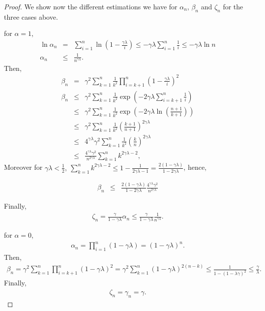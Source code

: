 \begin{proof}
We show now the different estimations we have for $\alpha_n$, $\beta_n$ and $\zeta_n$ for the three cases above.
\BIT
\item for $\alpha = 1$, 
\begin{eqnarray*}
\ln \alpha_n &=& \sum_{i=1}^n \ln \left( 1 - \frac{\gamma \lambda}{i}\right) \leqslant -\gamma \lambda \sum_{i=1}^n \frac{1}{i} \leqslant -\gamma\lambda \ln n \\
\alpha_n &\leqslant& \frac{1}{n^{\gamma \lambda}}.
\end{eqnarray*}
Then, 
\begin{eqnarray*}
\beta_n &=& \gamma^2 \sum_{k=1}^n \frac{1}{k^2}\prod_{i=k+1}^n \left( 1-\frac{\gamma\lambda}{i} \right)^2 \\
\beta_n &\leqslant& \gamma^2 \sum_{k=1}^n \frac{1}{k^2}\exp\left( -2 \gamma\lambda \sum_{i=k+1}^n \frac{1}{i}  \right) \\
&\leqslant& \gamma^2 \sum_{k=1}^n \frac{1}{k^2}\exp\left( -2 \gamma\lambda \ln\left( \frac{n+1}{k+1} \right)  \right) \\
&\leqslant& \gamma^2 \sum_{k=1}^n \frac{1}{k^2}\left( \frac{k+1}{n+1} \right)^{2\gamma\lambda}  \\
&\leqslant& 4^{\gamma\lambda}\gamma^2 \sum_{k=1}^n \frac{1}{k^2}\left( \frac{k}{n} \right)^{2\gamma\lambda}  \\
&\leqslant& \frac{4^{\gamma\lambda}\gamma^2}{n^{2\gamma\lambda}} \sum_{k=1}^n k^{2\gamma\lambda-2},
\end{eqnarray*}
Moreover for $\displaystyle \gamma\lambda < \frac{1}{2},\  \sum_{k=1}^n k^{2\gamma\lambda-2} \leqslant 1 - \frac{1}{2\gamma\lambda-1} = \frac{2(1-\gamma\lambda)}{1-2\gamma\lambda}$, hence,

\begin{eqnarray*}
\beta_n &\leqslant&  \frac{2(1-\gamma\lambda)}{1-2\gamma\lambda} \frac{4^{\gamma\lambda}\gamma^2}{n^{2\gamma\lambda}}
\end{eqnarray*}

Finally,
\begin{eqnarray*}
\zeta_n = \frac{\gamma}{1-\gamma\lambda} \alpha_n \leqslant \frac{\gamma}{1-\gamma\lambda} \frac{1}{n^{\gamma\lambda}}.
\end{eqnarray*}

\item for $\alpha = 0$, 
\begin{eqnarray*}
\alpha_n = \prod_{i=1}^n \left( 1 - \gamma \lambda\right) = (1-\gamma\lambda)^n.
\end{eqnarray*}
Then, 
\begin{eqnarray*}
\beta_n = \gamma^2 \sum_{k=1}^n \prod_{i=k+1}^n \left( 1-\gamma\lambda \right)^2 = \gamma^2 \sum_{k=1}^n \left( 1- \gamma\lambda \right)^{2(n-k)} \leqslant \frac{1}{1-(1-\lambda\gamma)^2} \leqslant \frac{\gamma}{\lambda}.
\end{eqnarray*}
Finally,
\begin{eqnarray*}
\zeta_n = \gamma_n = \gamma.
\end{eqnarray*}


\end{proof}
